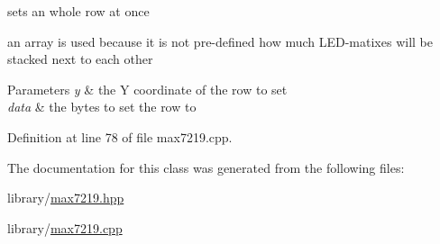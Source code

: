 sets an whole row at once 

an array is used because it is not pre-\/defined how much L\+E\+D-\/matixes will be stacked next to each other 
\begin{DoxyParams}{Parameters}
{\em y} & the Y coordinate of the row to set \\
\hline
{\em data} & the bytes to set the row to \\
\hline
\end{DoxyParams}


Definition at line 78 of file max7219.\+cpp.



The documentation for this class was generated from the following files\+:\begin{DoxyCompactItemize}
\item 
library/\mbox{\hyperlink{max7219_8hpp}{max7219.\+hpp}}\item 
library/\mbox{\hyperlink{max7219_8cpp}{max7219.\+cpp}}\end{DoxyCompactItemize}
